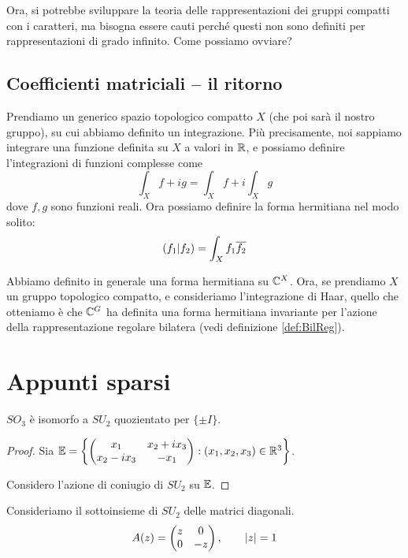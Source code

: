 	Ora, si potrebbe sviluppare la teoria delle rappresentazioni dei gruppi compatti con i caratteri, ma bisogna essere cauti perché questi non sono definiti per rappresentazioni di grado infinito. Come possiamo ovviare?
	
	\subsection{Coefficienti matriciali -- il ritorno}
		Prendiamo un generico spazio topologico compatto $X$ (che poi sarà il nostro gruppo), su cui abbiamo definito un integrazione. Più precisamente, noi sappiamo integrare una funzione definita su $X$ a valori in $\mathbb R$, e possiamo definire l'integrazioni di funzioni complesse come
		\[
		 \int_X f+ig = \int_X f +i\int_X g
		\]
		dove $f,g$ sono funzioni reali. Ora possiamo definire la forma hermitiana nel modo solito:
		\[
			\left(f_1 | f_2\right) = \int_X f_1 \overline{f_2}  
		\]
		
		Abbiamo definito in generale una forma hermitiana su $\mathbb C^{X}$. Ora, se prendiamo $X$ un gruppo topologico compatto, e consideriamo l'integrazione di Haar, quello che otteniamo è che $\mathbb C^{G}$ ha definita una forma hermitiana invariante per l'azione della rappresentazione regolare bilatera (vedi definizione \ref{def:BilReg}).
		

	



\section{Appunti sparsi}


\begin{myprop}
 $SO_3$ è isomorfo a $SU_2$ quozientato per $\{\pm I\}$.
\end{myprop}
\begin{proof}
	Sia $\mathbb E=\left\{\left(
		\begin{matrix}
			x_1	& x_2+ix_3 \\
			x_2-ix_3 & -x_1 
		\end{matrix}
	\right): (x_1,x_2,x_3) \in \mathbb R^3\right\}$.

	Considero l'azione di coniugio di $SU_2$ su $\mathbb E$. 
\end{proof}

Consideriamo il sottoinsieme di $SU_2$ delle matrici diagonali.
\[
	A(z) = \left(
		\begin{matrix}
		z & 0 \\
		0 & -z
		\end{matrix}
	\right), \qquad \left|z\right|=1
\]


